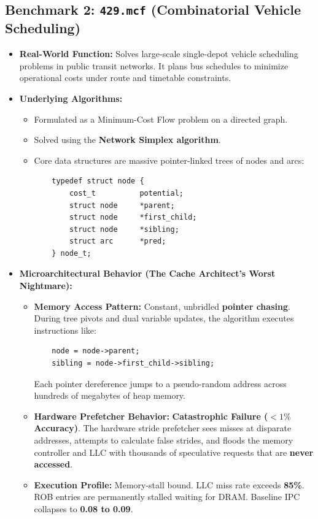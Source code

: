 \documentclass[11pt, a4paper]{article}
\begin{document}
\subsection{Benchmark 2: \texttt{429.mcf} (Combinatorial Vehicle Scheduling)}
\begin{itemize}[leftmargin=1.5em]
  \item \textbf{Real-World Function:} Solves large-scale single-depot vehicle scheduling problems in public transit networks. It plans bus schedules to minimize operational costs under route and timetable constraints.
  \item \textbf{Underlying Algorithms:}
  \begin{itemize}
    \item Formulated as a Minimum-Cost Flow problem on a directed graph.
    \item Solved using the \textbf{Network Simplex algorithm}.
    \item Core data structures are massive pointer-linked trees of nodes and arcs:
    \begin{verbatim}
    typedef struct node {
        cost_t          potential;
        struct node     *parent;
        struct node     *first_child;
        struct node     *sibling;
        struct arc      *pred;
    } node_t;
    \end{verbatim}
  \end{itemize}
  \item \textbf{Microarchitectural Behavior (The Cache Architect's Worst Nightmare):}
  \begin{itemize}
    \item \textbf{Memory Access Pattern:} Constant, unbridled \textbf{pointer chasing}. During tree pivots and dual variable updates, the algorithm executes instructions like:
    \begin{verbatim}
    node = node->parent;
    sibling = node->first_child->sibling;
    \end{verbatim}
    Each pointer dereference jumps to a pseudo-random address across hundreds of megabytes of heap memory.
    \item \textbf{Hardware Prefetcher Behavior:} \textbf{Catastrophic Failure ($<1\%$ Accuracy)}. The hardware stride prefetcher sees misses at disparate addresses, attempts to calculate false strides, and floods the memory controller and LLC with thousands of speculative requests that are \textbf{never accessed}.
    \item \textbf{Execution Profile:} Memory-stall bound. LLC miss rate exceeds \textbf{85\%}. ROB entries are permanently stalled waiting for DRAM. Baseline IPC collapses to \textbf{0.08 to 0.09}.
  \end{itemize}
\end{itemize}
\end{document}
